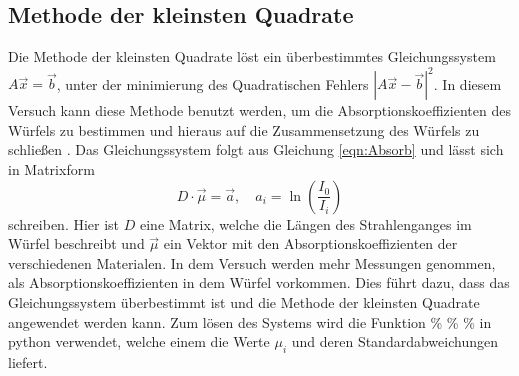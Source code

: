 \subsection{Methode der kleinsten Quadrate}
Die Methode der kleinsten Quadrate löst ein überbestimmtes Gleichungssystem $A\vec{x} = \vec{b}$, unter der minimierung des Quadratischen Fehlers $ |A\vec{x} -\vec{b}|^2$. In diesem Versuch kann diese Methode benutzt werden, um die Absorptionskoeffizienten des Würfels zu bestimmen und hieraus auf die Zusammensetzung des Würfels zu schließen . 
Das Gleichungssystem folgt aus Gleichung \ref{eqn:Absorb} und lässt sich in Matrixform
\begin{equation*}
    D \cdot \vec{\mu} = \vec{a} , \quad a_i = \ln \left(\frac{I_0}{I_i} \right)
\end{equation*}
schreiben.
Hier ist $D$ eine Matrix, welche die Längen des Strahlenganges im Würfel beschreibt und $\vec{\mu}$ ein Vektor mit den Absorptionskoeffizienten der verschiedenen Materialen.
In dem Versuch werden mehr Messungen genommen, als Absorptionskoeffizienten in dem Würfel vorkommen. Dies führt dazu, dass das Gleichungssystem überbestimmt ist und die Methode der kleinsten Quadrate angewendet werden kann.
Zum lösen des Systems wird die Funktion \% \% \% in python verwendet, welche einem die Werte $\mu_i$ und deren Standardabweichungen liefert.